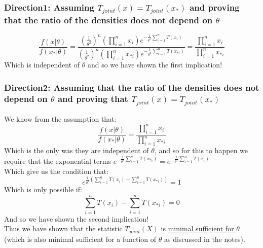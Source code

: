 \documentclass[12pt]{article}
\begin{document}
\subsubsection*{Direction1: Assuming $T_{joint}(x) = T_{joint}(x_*)$ and proving that the ratio of the densities does not depend on $\theta$}
\[
\frac{f(x|\theta)}{f(x_*|\theta)} = \frac{(\frac{1}{\theta^2})^n (\prod_{i=1}^{n}x_i)e^{-\frac{1}{\theta^2}\sum_{i=1}^{n}T(x_i)}}{(\frac{1}{\theta^2})^n (\prod_{i=1}^{n}x_{*i})e^{-\frac{1}{\theta^2}\sum_{i=1}^{n}T(x_{*i})}} = \frac{\prod_{i=1}^{n}x_i}{\prod_{i=1}^{n}x_{*i}}
\]
Which is independent of $\theta$ and so we have shown the first implication!
\subsubsection*{Direction2: Assuming that the ratio of the densities does not depend on $\theta$ and proving that $T_{joint}(x) = T_{joint}(x_*)$}
We know from the assumption that: 
\[
\frac{f(x|\theta)}{f(x_*|\theta)} = \frac{\prod_{i=1}^{n}x_i}{\prod_{i=1}^{n}x_{*i}}
\]
Which is the only was they are independent of $\theta$, and so for this to happen we require that the exponential terms $e^{-\frac{1}{\theta^2}\sum_{i=1}^{n}T(x_{*i})} = e^{-\frac{1}{\theta^2}\sum_{i=1}^{n}T(x_{i})}$\\ Which give us the condition that: 
\[
e^{\frac{1}{\theta^2}(\sum_{i=1}^{n}T(x_{i})-\sum_{i=1}^{n}T(x_{*i}))} = 1
\]
Which is only possible if:
\[
\sum_{i=1}^{n}T(x_{i}) -\sum_{i=1}^{n}T(x_{*i})=0 
\]
And so we have shown the second implication!\\
Thus we have shown that the statistic $T_{joint}(X)$ is \underline{minimal sufficient for $\theta$} \\ (which is also minimal sufficient for a function of $\theta$ as discussed in the notes).
\end{document}
